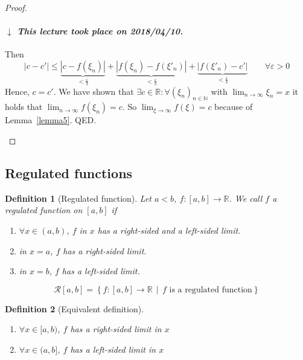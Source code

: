 \documentclass{article}
\newtheorem{definition}{Definition}  \numberwithin{definition}{section}
\newcommand{\setdef}[2]{\left\{\left.#1\,\middle|\,#2\right.\right\}}
\newcommand{\card}[1]{\left|#1\right|}
\newcommand{\dateref}[1]{%
  \begin{mdframed}[backgroundcolor=gray!10,innerbottommargin=0pt,innertopmargin=0pt]
    \paragraph{\textit{$\downarrow$ This lecture took place on #1.}}%
  \end{mdframed}%
}
\begin{document}
\begin{proof}
\begin{description}
      \dateref{2018/04/10}

      Then
      \[ \card{c - c'} \leq \underbrace{\card{c - f(\xi_n)}}_{< \frac\varepsilon3} + \underbrace{\card{f(\xi_n) - f(\xi'_n)}}_{< \frac\varepsilon3} + \underbrace{\card{f(\xi'_n) - c'}}_{< \frac\varepsilon3} \qquad \forall \varepsilon > 0 \]
      Hence, $c = c'$.
      We have shown that $\exists c \in \mathbb R: \forall (\xi_n)_{n \in \mathbb N}$ with $\lim_{n\to\infty} \xi_n = x$ it holds that
      $\lim_{n\to\infty} f(\xi_n) = c$. So $\lim_{\xi\to\infty} f(\xi) = c$ because of Lemma~\ref{lemma5}. QED.
  \end{description}
\end{proof}

\subsection{Regulated functions}

\begin{definition}[Regulated function] %
  Let $a < b$, $f: [a,b] \to \mathbb R$. We call $f$ a \emph{regulated function on $[a,b]$} if
  \begin{enumerate}
    \item $\forall x \in (a,b)$, $f$ in $x$ has a right-sided and a left-sided limit.
    \item in $x = a$, $f$ has a right-sided limit.
    \item in $x = b$, $f$ has a left-sided limit.
  \end{enumerate}
  \[ \mathcal R[a,b] = \setdef{f: [a,b] \to \mathbb R}{f \text{ is a regulated function}} \]
\end{definition}

\begin{definition}[Equivalent definition] \hfill{}
  \begin{enumerate}
    \item $\forall x \in [a,b)$, $f$ has a right-sided limit in $x$
    \item $\forall x \in (a,b]$, $f$ has a left-sided limit in $x$
  \end{enumerate}
\end{definition}
\end{document}
